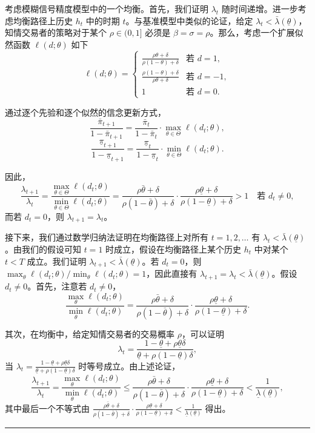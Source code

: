 \documentclass[12pt,a4paper]{article}
\newenvironment{translation}{%
  \par\vspace{2pt}\noindent%
  \color{transblue}%
  \ignorespaces
}{%
  \par\vspace{4pt}\hrule\vspace{6pt}%
}
\begin{document}
\begin{translation}
考虑模糊信号精度模型中的一个均衡。首先，我们证明 $\lambda_t$ 随时间递增。进一步考虑均衡路径上历史 $h_t$ 中的时期 $t$。与基准模型中类似的论证，给定 $\lambda_t < \bar{\lambda}(\underline{\theta})$，知情交易者的策略对于某个 $\rho \in (0, 1]$ 必须是 $\beta = \sigma = \rho$。那么，考虑一个扩展似然函数 $\ell(d; \theta)$ 如下
\[
\ell(d; \theta) = \begin{cases}
\frac{\rho\theta + \delta}{\rho(1-\theta) + \delta} & \text{若 } d = 1,\\
\frac{\rho(1-\theta) + \delta}{\rho\theta + \delta} & \text{若 } d = -1,\\
1 & \text{若 } d = 0.
\end{cases}
\]

通过逐个先验和逐个似然的信念更新方式，
\[
\frac{\bar{\pi}_{t+1}}{1 - \bar{\pi}_{t+1}} = \frac{\bar{\pi}_t}{1 - \bar{\pi}_t} \cdot \max_{\theta\in\Theta} \ell(d_t; \theta),
\]
\[
\frac{\underline{\pi}_{t+1}}{1 - \underline{\pi}_{t+1}} = \frac{\underline{\pi}_t}{1 - \underline{\pi}_t} \cdot \min_{\theta\in\Theta} \ell(d_t; \theta).
\]

因此，
\[
\frac{\lambda_{t+1}}{\lambda_t} = \frac{\max_{\theta\in\Theta} \ell(d_t; \theta)}{\min_{\theta\in\Theta} \ell(d_t; \theta)}
= \frac{\rho\bar{\theta} + \delta}{\rho(1-\bar{\theta}) + \delta} \cdot \frac{\rho\underline{\theta} + \delta}{\rho(1-\underline{\theta}) + \delta} > 1 \quad \text{若 } d_t \neq 0,
\]
而若 $d_t = 0$，则 $\lambda_{t+1} = \lambda_t$。

接下来，我们通过数学归纳法证明在均衡路径上对所有 $t = 1, 2, \dots$ 有 $\lambda_t < \bar{\lambda}(\underline{\theta})$。由我们的假设可知 $t = 1$ 时成立，假设在均衡路径上某个历史 $h_t$ 中对某个 $t < T$ 成立。我们证明 $\lambda_{t+1} < \bar{\lambda}(\underline{\theta})$。若 $d_t = 0$，则 $\max_{\theta} \ell(d_t; \theta) / \min_{\theta} \ell(d_t; \theta) = 1$，因此直接有 $\lambda_{t+1} = \lambda_t < \bar{\lambda}(\underline{\theta})$。假设 $d_t \neq 0$。首先，注意若 $d_t \neq 0$，
\[
\frac{\max_{\theta} \ell(d_t; \theta)}{\min_{\theta} \ell(d_t; \theta)} = \frac{\rho\bar{\theta} + \delta}{\rho(1-\bar{\theta}) + \delta} \cdot \frac{\rho\underline{\theta} + \delta}{\rho(1-\underline{\theta}) + \delta}.
\]

其次，在均衡中，给定知情交易者的交易概率 $\rho$，可以证明
\[
\lambda_t = \frac{1-\underline{\theta} + \rho\underline{\theta}\delta}{\underline{\theta} + \rho(1-\underline{\theta})\delta},
\]
当 $\lambda_t = \frac{1-\underline{\theta} + \rho\underline{\theta}\delta}{\underline{\theta} + \rho(1-\underline{\theta})\delta}$ 时等号成立。由上述论证，
\[
\frac{\lambda_{t+1}}{\lambda_t} = \frac{\max_{\theta} \ell(d_t; \theta)}{\min_{\theta} \ell(d_t; \theta)}
\leq \frac{\rho\bar{\theta} + \delta}{\rho(1-\bar{\theta}) + \delta} \cdot \frac{\rho\underline{\theta} + \delta}{\rho(1-\underline{\theta}) + \delta} < \frac{1}{\underline{\lambda}(\underline{\theta})},
\]
其中最后一个不等式由 $\frac{\rho\bar{\theta} + \delta}{\rho(1-\bar{\theta}) + \delta} \cdot \frac{\rho\underline{\theta} + \delta}{\rho(1-\underline{\theta}) + \delta} < \frac{1}{\underline{\lambda}(\underline{\theta})}$ 得出。


\end{translation}
\end{document}

